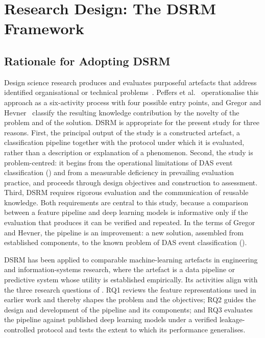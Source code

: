 \section{Research Design: The DSRM Framework}
\label{sec:chap3DSRMFramework}

\subsection{Rationale for Adopting DSRM}
\label{sec:chap3DSRMRationale}
Design science research produces and evaluates purposeful artefacts that address identified organisational or technical problems~\cite{hevner2004design}. Peffers et al.~\cite{peffers2007dsrm} operationalise this approach as a six-activity process with four possible entry points, and Gregor and Hevner~\cite{gregor2013positioning} classify the resulting knowledge contribution by the novelty of the problem and of the solution. DSRM is appropriate for the present study for three reasons. First, the principal output of the study is a constructed artefact, a classification pipeline together with the protocol under which it is evaluated, rather than a description or explanation of a phenomenon. Second, the study is problem-centred: it begins from the operational limitations of DAS event classification () and from a measurable deficiency in prevailing evaluation practice, and proceeds through design objectives and construction to assessment. Third, DSRM requires rigorous evaluation and the communication of reusable knowledge. Both requirements are central to this study, because a comparison between a feature pipeline and deep learning models is informative only if the evaluation that produces it can be verified and repeated. In the terms of Gregor and Hevner, the pipeline is an improvement: a new solution, assembled from established components, to the known problem of DAS event classification ().

DSRM has been applied to comparable machine-learning artefacts in engineering and information-systems research, where the artefact is a data pipeline or predictive system whose utility is established empirically. Its activities align with the three research questions of . RQ1 reviews the feature representations used in earlier work and thereby shapes the problem and the objectives; RQ2 guides the design and development of the pipeline and its components; and RQ3 evaluates the pipeline against published deep learning models under a verified leakage-controlled protocol and tests the extent to which its performance generalises.

